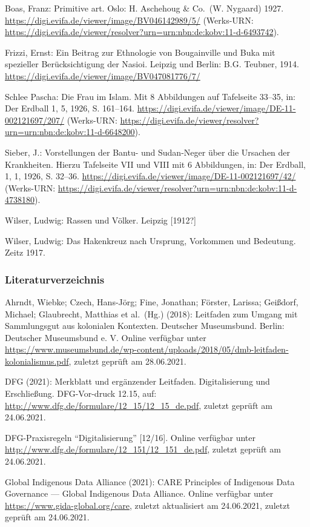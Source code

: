 \documentclass[a4paper,
fontsize=11pt,
oneside,
numbers=noperiodatend,
parskip=half-,
bibliography=totoc,
final
]{scrartcl}
\begin{document}
Boas, Franz: Primitive art. Oslo: H. Aschehoug \& Co.~(W. Nygaard) 1927.
\url{https://digi.evifa.de/viewer/image/BV046142989/5/} (Werks-URN:
\url{https://digi.evifa.de/viewer/resolver?urn=urn:nbn:de:kobv:11-d-6493742}).

Frizzi, Ernst: Ein Beitrag zur Ethnologie von Bougainville und Buka mit
spezieller Berücksichtigung der Nasioi. Leipzig und Berlin: B.G.
Teubner, 1914. \url{https://digi.evifa.de/viewer/image/BV047081776/7/}

Schlee Pascha: Die Frau im Islam. Mit 8 Abbildungen auf Tafelseite
33--35, in: Der Erdball 1, 5, 1926, S. 161--164.
\url{https://digi.evifa.de/viewer/image/DE-11-002121697/207/}
(Werks-URN:
\url{https://digi.evifa.de/viewer/resolver?urn=urn:nbn:de:kobv:11-d-6648200}).

Sieber, J.: Vorstellungen der Bantu- und Sudan-Neger über die Ursachen
der Krankheiten. Hierzu Tafelseite VII und VIII mit 6 Abbildungen, in:
Der Erdball, 1, 1, 1926, S. 32--36.
\url{https://digi.evifa.de/viewer/image/DE-11-002121697/42/} (Werks-URN:
\url{https://digi.evifa.de/viewer/resolver?urn=urn:nbn:de:kobv:11-d-4738180}).

Wilser, Ludwig: Rassen und Völker. Leipzig {[}1912?{]}

Wilser, Ludwig: Das Hakenkreuz nach Ursprung, Vorkommen und Bedeutung.
Zeitz 1917.

\hypertarget{literaturverzeichnis}{%
\subsubsection{Literaturverzeichnis}\label{literaturverzeichnis}}

Ahrndt, Wiebke; Czech, Hans-Jörg; Fine, Jonathan; Förster, Larissa;
Geißdorf, Michael; Glaubrecht, Matthias et al.~(Hg.) (2018): Leitfaden
zum Umgang mit Sammlungsgut aus kolonialen Kontexten. Deutscher
Museumsbund. Berlin: Deutscher Museumsbund e. V. Online verfügbar unter
\url{https://www.museumsbund.de/wp-content/uploads/2018/05/dmb-leitfaden-kolonialismus.pdf},
zuletzt geprüft am 28.06.2021.

DFG (2021): Merkblatt und ergänzender Leitfaden. Digitalisierung und
Erschließung. DFG-Vor-druck 12.15, auf:
\url{http://www.dfg.de/formulare/12_15/12_15_de.pdf}, zuletzt geprüft am
24.06.2021.

DFG-Praxisregeln \enquote{Digitalisierung} {[}12/16{]}. Online verfügbar
unter \url{http://www.dfg.de/formulare/12_151/12_151_de.pdf}, zuletzt
geprüft am 24.06.2021.

Global Indigenous Data Alliance (2021): CARE Principles of Indigenous
Data Governance --- Global Indigenous Data Alliance. Online verfügbar
unter \url{https://www.gida-global.org/care}, zuletzt aktualisiert am
24.06.2021, zuletzt geprüft am 24.06.2021.
\end{document}
